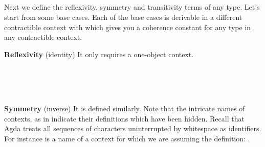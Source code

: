 \begin{code}\>\<%
\\
\> \<[9]%
\>[9]\AgdaSymbol{:}  \AgdaSymbol{\}(} \AgdaSymbol{:}  \AgdaSymbol{)(} \AgdaSymbol{:}  \AgdaSymbol{)}   \<%
\\
\>[0]\<[9]%
\>[9]  \AgdaSymbol{(}  \AgdaSymbol{)}\<%
\\
\> \AgdaSymbol{\{\_\}} \AgdaSymbol{\{}\AgdaSymbol{\}}  \AgdaSymbol{\_}  \AgdaSymbol{=}  \AgdaSymbol{(}  \AgdaSymbol{)} \AgdaSymbol{\_} \AgdaSymbol{\_}\<%
\\
\>\<\end{code}
Next we define the reflexivity, symmetry and transitivity terms of any type. Let's start from some base cases. Each of the base cases is derivable in a different contractible context with  which gives you a coherence constant for any type in any contractible context.

\noindent \textbf{Reflexivity} (identity) It only requires a one-object context.

\begin{code}\>\<%
\\
\> \AgdaSymbol{:}  \AgdaSymbol{\{}\AgdaSymbol{\}} \AgdaSymbol{(}    \AgdaSymbol{)}\<%
\\
\> \AgdaSymbol{=}  \<%
\\
\>\<\end{code}
\noindent  \textbf{Symmetry} (inverse) It is defined similarly. Note that the intricate names of contexts, as in   indicate their definitions which have been hidden. Recall that Agda treats all sequences of characters uninterrupted by whitespace as identifiers. For instance  is a name of a context for which we are assuming the definition:
 \AgdaSymbol{=}  \AgdaInductiveConstructor{,} \AgdaInductiveConstructor{*} \AgdaInductiveConstructor{,} \AgdaInductiveConstructor{*} \AgdaInductiveConstructor{,} \AgdaSymbol{(} \AgdaSymbol{(} \AgdaSymbol{)}   \AgdaSymbol{)}.


